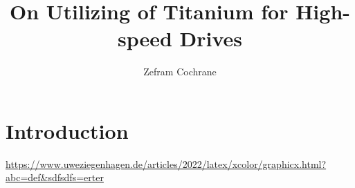\documentclass[12pt,english,twocolumn]{article}
\author{Zefram Cochrane}
\title{On Utilizing of Titanium for High-speed Drives}
\begin{document}
\maketitle

\section{Introduction}

\blindtext[2] \url{https://www.uweziegenhagen.de/articles/2022/latex/xcolor/graphicx.html?abc=def&sdfsdfs=erter}

\blindtext[2]

\blindtext[2]

\blindtext[2]
\end{document}
